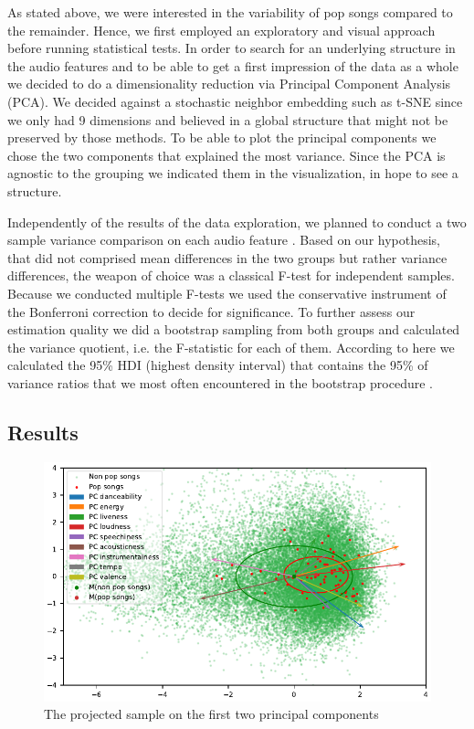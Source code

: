 \documentclass{article}
\begin{document}
As stated above, we were interested in the variability of pop songs compared to the remainder. Hence, we first employed an exploratory and visual approach before running statistical tests. In order to search for an underlying structure in the audio features and to be able to get a first impression of the data as a whole we decided to do a dimensionality reduction via Principal Component Analysis (PCA). We decided against a stochastic neighbor embedding such as t-SNE since we only had 9 dimensions and believed in a global structure that might not be preserved by those methods. To be able to plot the principal components we chose the two components that explained the most variance. Since the PCA is agnostic to the grouping we indicated them in the visualization, in hope to see a structure.

Independently of the results of the data exploration, we planned to conduct a two sample variance comparison on each audio feature \citep{snedecor1989}. Based on our hypothesis, that did not comprised mean differences in the two groups but rather variance differences, the weapon of choice was a classical F-test for independent samples. Because we conducted multiple F-tests we used the conservative instrument of the Bonferroni correction to decide for significance. To further assess our estimation quality we did a bootstrap sampling from both groups and calculated the variance quotient, i.e. the F-statistic for each of them. According to  here \cite{kruschke2014doing}
we calculated the 95\% HDI (highest density interval) that contains the 95\% of variance ratios that we most often encountered in the bootstrap procedure .

\subsection{Results}

\begin{figure}
  \centering
  \includegraphics[]{../fig/001_pca.pdf}
  \caption{The projected sample on the first two principal components}
\end{figure}
\end{document}

